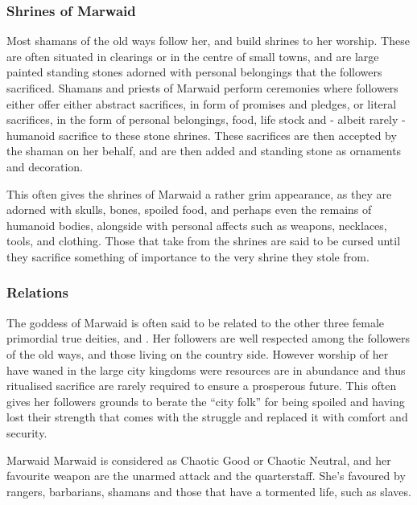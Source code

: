 \subsubsection{Shrines of Marwaid}

Most shamans of the old ways follow her, and build shrines to her worship.
These are often situated in clearings or in the centre of small towns, and are
large painted standing stones adorned with personal belongings that the
followers sacrificed. Shamans and priests of Marwaid perform ceremonies where
followers either offer either abstract sacrifices, in form of promises and
pledges, or literal sacrifices, in the form of personal belongings, food, life
stock and - albeit rarely - humanoid sacrifice to these stone shrines. These
sacrifices are then accepted by the shaman on her behalf, and are then added
and standing stone as ornaments and decoration.

This often gives the shrines of Marwaid a rather grim appearance, as they are
adorned with skulls, bones, spoiled food, and perhaps even the remains of
humanoid bodies, alongside with personal affects such as weapons, necklaces,
tools, and clothing. Those that take from the shrines are said to be cursed
until they sacrifice something of importance to the very shrine they stole
from.

\subsubsection{Relations}

The goddess of Marwaid is often said to be related to the other three
female primordial true deities,  and .
Her followers are well respected among the followers of the old ways, and
those living on the country side. However worship of her have waned in the
large city kingdoms were resources are in abundance and thus ritualised
sacrifice are rarely required to ensure a prosperous future. This often gives
her followers grounds to berate the ``city folk'' for being spoiled and having
lost their strength that comes with the struggle and replaced it with comfort
and security.

\begin{35e}{Marwaid}
  Marwaid is considered as Chaotic Good or Chaotic Neutral, and her favourite
  weapon are the unarmed attack and the quarterstaff. She's favoured by rangers,
  barbarians, shamans and those that have a tormented life, such as slaves.
\end{35e}

\clearpage
{}
\clearpage

